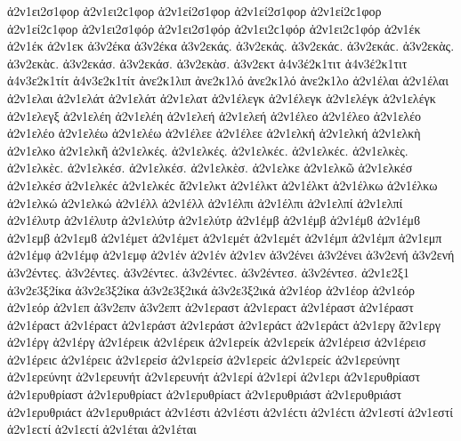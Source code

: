 {ἀ2ν1ει2σ1φορ ἀ2ν1ει2ϲ1φορ   %
ἀ2ν1εί2σ1φορ ἀ2ν1εί2σ1φορ ἀ2ν1εί2ϲ1φορ ἀ2ν1εί2ϲ1φορ   %
ἀ2ν1ει2σ1φόρ ἀ2ν1ει2σ1φόρ ἀ2ν1ει2ϲ1φόρ ἀ2ν1ει2ϲ1φόρ
ἀ2ν1έκ ἀ2ν1έκ   %
ἀ2ν1εκ
ἀ3ν2έκα ἀ3ν2έκα   %
ἀ3ν2εκάς. ἀ3ν2εκάς. ἀ3ν2εκάϲ. ἀ3ν2εκάϲ.   %
ἀ3ν2εκὰς. ἀ3ν2εκὰϲ.
ἀ3ν2εκάσ. ἀ3ν2εκάσ.
ἀ3ν2εκὰσ.
ἀ3ν2εκτ   %
ἀ4ν3έ2κ1τιτ ἀ4ν3έ2κ1τιτ   %
ἀ4ν3ε2κ1τίτ ἀ4ν3ε2κ1τίτ
ἀνε2κ1λιπ   %
ἀνε2κ1λό ἀνε2κ1λό   %
ἀνε2κ1λο
ἀ2ν1έλαι ἀ2ν1έλαι   %
ἀ2ν1ελαι
ἀ2ν1ελάτ ἀ2ν1ελάτ   %
ἀ2ν1ελατ
ἀ2ν1έλεγκ ἀ2ν1έλεγκ   %
ἀ2ν1ελέγκ ἀ2ν1ελέγκ
ἀ2ν1ελεγξ   %
ἀ2ν1ελέη ἀ2ν1ελέη   %
ἀ2ν1ελεή ἀ2ν1ελεή
ἀ2ν1έλεο ἀ2ν1έλεο   %
ἀ2ν1ελέο ἀ2ν1ελέο
ἀ2ν1ελέω ἀ2ν1ελέω
ἀ2ν1έλεε ἀ2ν1έλεε
ἀ2ν1ελκή ἀ2ν1ελκή   %
ἀ2ν1ελκὴ
ἀ2ν1ελκο
ἀ2ν1ελκῆ
ἀ2ν1ελκές. ἀ2ν1ελκές. ἀ2ν1ελκέϲ. ἀ2ν1ελκέϲ.
ἀ2ν1ελκὲς. ἀ2ν1ελκὲϲ.
ἀ2ν1ελκέσ. ἀ2ν1ελκέσ.
ἀ2ν1ελκὲσ.
ἀ2ν1ελκε
ἀ2ν1ελκῶ
ἀ2ν1ελκέσ ἀ2ν1ελκέσ ἀ2ν1ελκέϲ ἀ2ν1ελκέϲ
ἄ2ν1ελκτ   %
ἀ2ν1έλκτ ἀ2ν1έλκτ
ἀ2ν1έλκω ἀ2ν1έλκω   %
ἀ2ν1ελκώ ἀ2ν1ελκώ
ἀ2ν1έλλ ἀ2ν1έλλ   %
ἀ2ν1έλπι ἀ2ν1έλπι   %
ἀ2ν1ελπί ἀ2ν1ελπί
ἀ2ν1έλυτρ ἀ2ν1έλυτρ   %
ἀ2ν1ελύτρ ἀ2ν1ελύτρ
ἀ2ν1έμβ ἀ2ν1έμβ ἀ2ν1έμϐ ἀ2ν1έμϐ %
ἀ2ν1εμβ ἀ2ν1εμϐ
ἀ2ν1έμετ ἀ2ν1έμετ   %
ἀ2ν1εμέτ ἀ2ν1εμέτ
ἀ2ν1έμπ ἀ2ν1έμπ   %
ἀ2ν1εμπ
ἀ2ν1έμφ ἀ2ν1έμφ   %
ἀ2ν1εμφ
ἀ2ν1έν ἀ2ν1έν   %
ἀ2ν1εν
ἀ3ν2ένει ἀ3ν2ένει   %
ἀ3ν2ενή ἀ3ν2ενή   %
ἀ3ν2έντες. ἀ3ν2έντες. ἀ3ν2έντεϲ. ἀ3ν2έντεϲ.   %
ἀ3ν2έντεσ. ἀ3ν2έντεσ.
ἀ2ν1ε2ξ1   %
ἀ3ν2ε3ξ2ίκα ἀ3ν2ε3ξ2ίκα   %
ἀ3ν2ε3ξ2ικά ἀ3ν2ε3ξ2ικά
ἀ2ν1έορ ἀ2ν1έορ   %
ἀ2ν1εόρ ἀ2ν1εόρ
ἀ2ν1επ   %
ἀ3ν2επν   %
ἀ3ν2επτ   %
ἀ2ν1εραστ ἀ2ν1εραϲτ   %
ἀ2ν1έραστ ἀ2ν1έραστ ἀ2ν1έραϲτ ἀ2ν1έραϲτ   %
ἀ2ν1εράστ ἀ2ν1εράστ ἀ2ν1εράϲτ ἀ2ν1εράϲτ
ἀ2ν1εργ   %
ἄ2ν1εργ   %
ἀ2ν1έργ ἀ2ν1έργ
ἀ2ν1έρεικ ἀ2ν1έρεικ   %
ἀ2ν1ερείκ ἀ2ν1ερείκ
ἀ2ν1έρεισ ἀ2ν1έρεισ ἀ2ν1έρειϲ ἀ2ν1έρειϲ   %
ἀ2ν1ερείσ ἀ2ν1ερείσ ἀ2ν1ερείϲ ἀ2ν1ερείϲ
ἀ2ν1ερεύνητ ἀ2ν1ερεύνητ   %
ἀ2ν1ερευνήτ ἀ2ν1ερευνήτ
ἀ2ν1ερί ἀ2ν1ερί   %
ἀ2ν1ερι
ἀ2ν1ερυθρίαστ ἀ2ν1ερυθρίαστ ἀ2ν1ερυθρίαϲτ ἀ2ν1ερυθρίαϲτ   %
ἀ2ν1ερυθριάστ ἀ2ν1ερυθριάστ ἀ2ν1ερυθριάϲτ ἀ2ν1ερυθριάϲτ
ἀ2ν1έστι ἀ2ν1έστι ἀ2ν1έϲτι ἀ2ν1έϲτι   %
ἀ2ν1εστί ἀ2ν1εστί ἀ2ν1εϲτί ἀ2ν1εϲτί
ἀ2ν1έται ἀ2ν1έται   %
}
